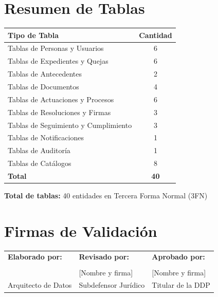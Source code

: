 \documentclass[12pt, a4paper]{article}
\begin{document}
\section*{Resumen de Tablas}
\begin{tcolorbox}[title=Estadísticas del Modelo, colback=gray!5!white]
    \begin{tabular}{|l|c|}
        \hline
        \rowcolor[gray]{0.9}
        \textbf{Tipo de Tabla} & \textbf{Cantidad} \\
        \hline
        Tablas de Personas y Usuarios & 6 \\
        \hline
        Tablas de Expedientes y Quejas & 6 \\
        \hline
        Tablas de Antecedentes & 2 \\
        \hline
        Tablas de Documentos & 4 \\
        \hline
        Tablas de Actuaciones y Procesos & 6 \\
        \hline
        Tablas de Resoluciones y Firmas & 3 \\
        \hline
        Tablas de Seguimiento y Cumplimiento & 3 \\
        \hline
        Tablas de Notificaciones & 1 \\
        \hline
        Tablas de Auditoría & 1 \\
        \hline
        Tablas de Catálogos & 8 \\
        \hline
        \textbf{Total} & \textbf{40} \\
        \hline
    \end{tabular}
    
    \vspace{0.5cm}
    \textbf{Total de tablas:} 40 entidades en Tercera Forma Normal (3FN)
\end{tcolorbox}

\section*{Firmas de Validación}
\vspace{1cm}

\begin{tabular}{p{}p{}p{}}
    \textbf{Elaborado por:} & \textbf{Revisado por:} & \textbf{Aprobado por:} \\
    \vspace{2cm} & \vspace{2cm} & \vspace{2cm} \\
    \hline
    [Nombre y firma] & [Nombre y firma] & [Nombre y firma] \\
    Arquitecto de Datos & Subdefensor Jurídico & Titular de la DDP \\
\end{tabular}
\end{document}
